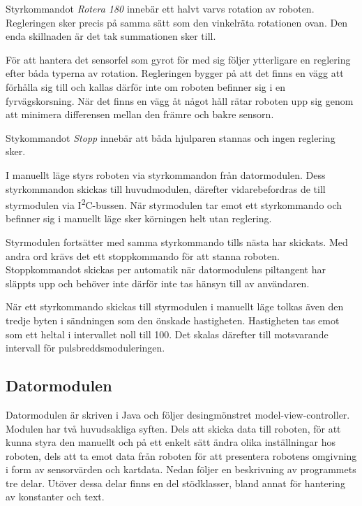 \documentclass[11pt]{article}
\begin{document}
\begin{flushleft}
\begin{description}[style=unboxed, leftmargin=0cm]
Styrkommandot \textit{Rotera 180\textdegree} innebär ett halvt varvs rotation av roboten. Regleringen sker precis på samma sätt som den vinkelräta rotationen ovan. Den enda skillnaden är det tak summationen sker till. 


För att hantera det sensorfel som gyrot för med sig följer ytterligare en reglering efter båda typerna av rotation. Regleringen bygger på att det finns en vägg att förhålla sig till och kallas därför inte om roboten befinner sig i en fyrvägskorsning. När det finns en vägg åt något håll rätar roboten upp sig genom att minimera differensen mellan den främre och bakre sensorn. 

Stykommandot \textit{Stopp} innebär att båda hjulparen stannas och ingen reglering sker. 

\item[Manuellt läge] I manuellt läge styrs roboten via styrkommandon från datormodulen. Dess styrkommandon skickas till huvudmodulen, därefter vidarebefordras de till styrmodulen via I\textsuperscript{2}C-bussen. När styrmodulen tar emot ett styrkommando och befinner sig i manuellt läge sker körningen helt utan reglering. 

  Styrmodulen fortsätter med samma styrkommando tills nästa har skickats. Med andra ord krävs det ett stoppkommando för att stanna roboten. Stoppkommandot skickas per automatik när datormodulens piltangent har släppts upp och behöver inte därför inte tas hänsyn till av användaren. 

  När ett styrkommando skickas till styrmodulen i manuellt läge tolkas även den tredje byten i sändningen som den önskade hastigheten. Hastigheten tas emot som ett heltal i intervallet noll till 100. Det skalas därefter till motsvarande intervall för pulsbreddsmoduleringen.

  \end{description}

\subsection{Datormodulen}
Datormodulen är skriven i Java och följer desingmönstret model-view-controller. Modulen har två huvudsakliga syften. Dels att skicka data till roboten, för att kunna styra den manuellt och på ett enkelt sätt ändra olika inställningar hos roboten, dels att ta emot data från roboten för att presentera robotens omgivning i form av sensorvärden och kartdata. Nedan följer en beskrivning av programmets tre delar. Utöver dessa delar finns en del stödklasser, bland annat för hantering av konstanter och text.%


\end{flushleft}
\end{document}
